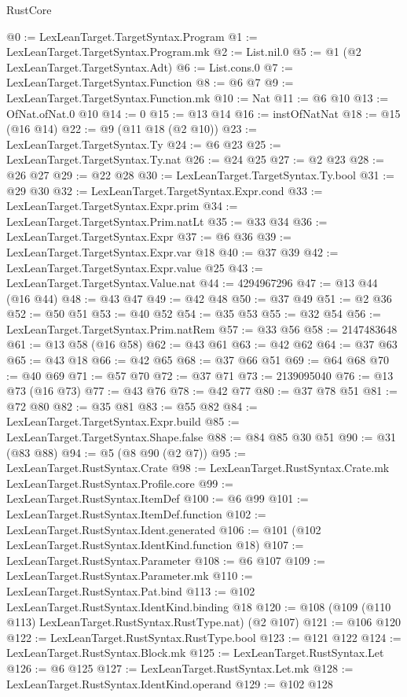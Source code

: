 \begin{lexlean}{RustCore}
\begin{coremodule}
@0 := LexLeanTarget.TargetSyntax.Program
@1 := LexLeanTarget.TargetSyntax.Program.mk
@2 := List.nil.{0}
@5 := @1 (@2 LexLeanTarget.TargetSyntax.Adt)
@6 := List.cons.{0}
@7 := LexLeanTarget.TargetSyntax.Function
@8 := @6 @7
@9 := LexLeanTarget.TargetSyntax.Function.mk
@10 := Nat
@11 := @6 @10
@13 := OfNat.ofNat.{0} @10
@14 := 0
@15 := @13 @14
@16 := instOfNatNat
@18 := @15 (@16 @14)
@22 := @9 (@11 @18 (@2 @10))
@23 := LexLeanTarget.TargetSyntax.Ty
@24 := @6 @23
@25 := LexLeanTarget.TargetSyntax.Ty.nat
@26 := @24 @25
@27 := @2 @23
@28 := @26 @27
@29 := @22 @28
@30 := LexLeanTarget.TargetSyntax.Ty.bool
@31 := @29 @30
@32 := LexLeanTarget.TargetSyntax.Expr.cond
@33 := LexLeanTarget.TargetSyntax.Expr.prim
@34 := LexLeanTarget.TargetSyntax.Prim.natLt
@35 := @33 @34
@36 := LexLeanTarget.TargetSyntax.Expr
@37 := @6 @36
@39 := LexLeanTarget.TargetSyntax.Expr.var @18
@40 := @37 @39
@42 := LexLeanTarget.TargetSyntax.Expr.value @25
@43 := LexLeanTarget.TargetSyntax.Value.nat
@44 := 4294967296
@47 := @13 @44 (@16 @44)
@48 := @43 @47
@49 := @42 @48
@50 := @37 @49
@51 := @2 @36
@52 := @50 @51
@53 := @40 @52
@54 := @35 @53
@55 := @32 @54
@56 := LexLeanTarget.TargetSyntax.Prim.natRem
@57 := @33 @56
@58 := 2147483648
@61 := @13 @58 (@16 @58)
@62 := @43 @61
@63 := @42 @62
@64 := @37 @63
@65 := @43 @18
@66 := @42 @65
@68 := @37 @66 @51
@69 := @64 @68
@70 := @40 @69
@71 := @57 @70
@72 := @37 @71
@73 := 2139095040
@76 := @13 @73 (@16 @73)
@77 := @43 @76
@78 := @42 @77
@80 := @37 @78 @51
@81 := @72 @80
@82 := @35 @81
@83 := @55 @82
@84 := LexLeanTarget.TargetSyntax.Expr.build
@85 := LexLeanTarget.TargetSyntax.Shape.false
@88 := @84 @85 @30 @51
@90 := @31 (@83 @88)
@94 := @5 (@8 @90 (@2 @7))
@95 := LexLeanTarget.RustSyntax.Crate
@98 := LexLeanTarget.RustSyntax.Crate.mk LexLeanTarget.RustSyntax.Profile.core
@99 := LexLeanTarget.RustSyntax.ItemDef
@100 := @6 @99
@101 := LexLeanTarget.RustSyntax.ItemDef.function
@102 := LexLeanTarget.RustSyntax.Ident.generated
@106 := @101 (@102 LexLeanTarget.RustSyntax.IdentKind.function @18)
@107 := LexLeanTarget.RustSyntax.Parameter
@108 := @6 @107
@109 := LexLeanTarget.RustSyntax.Parameter.mk
@110 := LexLeanTarget.RustSyntax.Pat.bind
@113 := @102 LexLeanTarget.RustSyntax.IdentKind.binding @18
@120 := @108 (@109 (@110 @113) LexLeanTarget.RustSyntax.RustType.nat) (@2 @107)
@121 := @106 @120
@122 := LexLeanTarget.RustSyntax.RustType.bool
@123 := @121 @122
@124 := LexLeanTarget.RustSyntax.Block.mk
@125 := LexLeanTarget.RustSyntax.Let
@126 := @6 @125
@127 := LexLeanTarget.RustSyntax.Let.mk
@128 := LexLeanTarget.RustSyntax.IdentKind.operand
@129 := @102 @128

\end{coremodule}
\end{lexlean}
